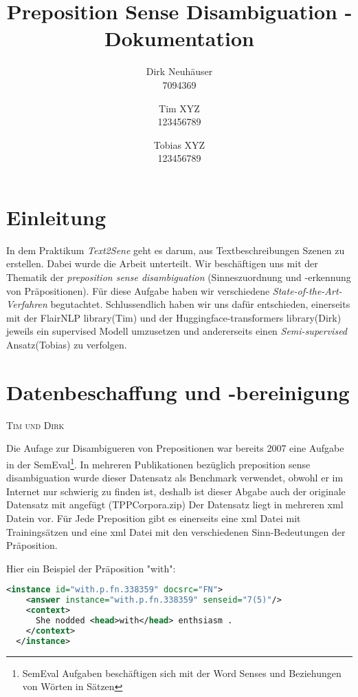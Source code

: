 \documentclass[10pt,a4paper]{article}
\newcommand{\chapterauthor}[1]{%
	{\parindent0pt\vspace*{-5pt}\hspace*{\fill}%
  \linespread{1.1}\large\scshape#1%
  \par\nobreak\vspace*{10pt}}
}
\begin{document}
\title{Preposition Sense Disambiguation - Dokumentation}
 
\author{
Dirk Neuhäuser \\ 7094369
\and
Tim XYZ \\ 123456789
\and 
Tobias XYZ \\ 123456789
}

\maketitle
\tableofcontents

\section{Einleitung}
In dem Praktikum \textit{Text2Sene} geht es darum, aus Textbeschreibungen Szenen zu erstellen. Dabei wurde die Arbeit unterteilt. Wir beschäftigen uns mit der Thematik der \textit{preposition sense disambiguation} (Sinneszuordnung und -erkennung von Präpositionen). Für diese Aufgabe haben wir verschiedene \textit{State-of-the-Art-Verfahren} begutachtet. Schlussendlich haben wir uns dafür entschieden, einerseits mit der FlairNLP library(Tim) und der Huggingface-transformers library(Dirk) jeweils ein supervised Modell umzusetzen und andererseits einen \textit{Semi-supervised} Ansatz(Tobias) zu verfolgen.

\section{Datenbeschaffung und -bereinigung}
\chapterauthor{Tim und Dirk}
Die Aufage zur Disambigueren von Prepositionen war bereits 2007 eine Aufgabe in der SemEval\footnote{SemEval Aufgaben beschäftigen sich mit der Word Senses und Beziehungen von Wörten in Sätzen}. In mehreren Publikationen bezüglich preposition sense disambiguation wurde dieser Datensatz als Benchmark verwendet, obwohl er im Internet nur schwierig zu finden ist, deshalb ist dieser Abgabe auch der originale Datensatz mit angefügt (TPPCorpora.zip)
Der Datensatz liegt in mehreren xml Datein vor. Für Jede Preposition gibt es einerseits eine xml Datei mit Trainingsätzen und eine xml Datei mit den verschiedenen Sinn-Bedeutungen der Präposition.

Hier ein Beispiel der Präposition "with": 

\begin{lstlisting}[language=xml]
  <instance id="with.p.fn.338359" docsrc="FN">
    <answer instance="with.p.fn.338359" senseid="7(5)"/>
    <context>
      She nodded <head>with</head> enthsiasm .
    </context>
  </instance>
\end{lstlisting}
\end{document}
